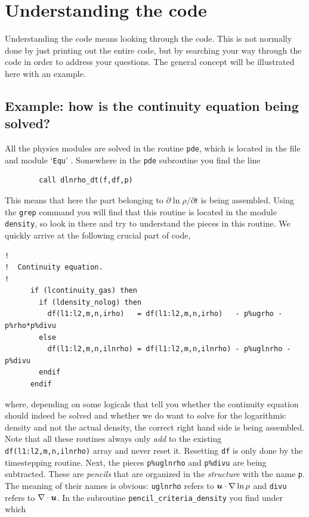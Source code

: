 \documentclass[\mydriver,12pt,twoside,notitlepage,a4paper]{article}
\makeatletter
\newcommand{\code}[1]{\texttt{#1}}
\newcommand{\cmd}{\command}
\newcommand{\command}[2][]{%
  \def\index@{#1}%
  \code{#2}%
  \ifx\index@\@empty\index{#2@\emph{#2}}%
  \else\index{#1@\emph{#1}}%
  \fi%
}
\newcommand{\file}[2][]{%
  \def\index@{#1}%
  `\texttt{#2}'%
  \ifx\index@\@empty\index[file]{#2@\texttt{#2}}%
  \else\index[file]{#1@\texttt{#1}}%
  \fi%
}
\renewcommand{\vec}[1]{\mbox{\boldmath{$#1$}}}
\newcommand{\uv}            {\vec{u}}
\makeatother
\begin{document}
\section{Understanding the code}

Understanding the code means looking through the code.
This is not normally done by just printing out the entire code,
but by searching your way through the code in order to address
your questions.
The general concept will be illustrated here with an example.

\subsection{Example: how is the continuity equation being solved?}

All the physics modules are solved in the routine \code{pde}, which
is located in the file and module \file{Equ}.
Somewhere in the \code{pde} subroutine you find the line
\begin{verbatim}
        call dlnrho_dt(f,df,p)
\end{verbatim}
This means that here the part belonging to $\partial\ln\rho/\partial t$
is being assembled.
Using the \cmd{grep} command you will find that this routine is located
in the module \code{density}, so look in there and try to understand
the pieces in this routine.
We quickly arrive at the following crucial part of code,
\begin{verbatim}
!
!  Continuity equation.
!
      if (lcontinuity_gas) then
        if (ldensity_nolog) then
          df(l1:l2,m,n,irho)   = df(l1:l2,m,n,irho)   - p%ugrho - p%rho*p%divu
        else
          df(l1:l2,m,n,ilnrho) = df(l1:l2,m,n,ilnrho) - p%uglnrho - p%divu
        endif
      endif
\end{verbatim}
where, depending on some logicals that tell you whether the continuity
equation should indeed be solved and whether we do want to
solve for the logarithmic density and not the actual density,
the correct right hand side is being assembled.
Note that all these routines always only \emph{add} to the existing
\code{df(l1:l2,m,n,ilnrho)} array and never reset it.
Resetting \code{df} is only done by the timestepping routine.
Next, the pieces \code{p\%uglnrho} and \code{p\%divu} are being
subtracted.
These are \emph{pencils} that are organized in the \emph{structure}
with the name \code{p}.
The meaning of their names is obvious: \code{uglnrho} refers to
$\uv\cdot\nabla\ln\rho$ and \code{divu} refers to $\nabla\cdot\uv$.
In the subroutine \code{pencil_criteria_density} you find under which
\end{document}
